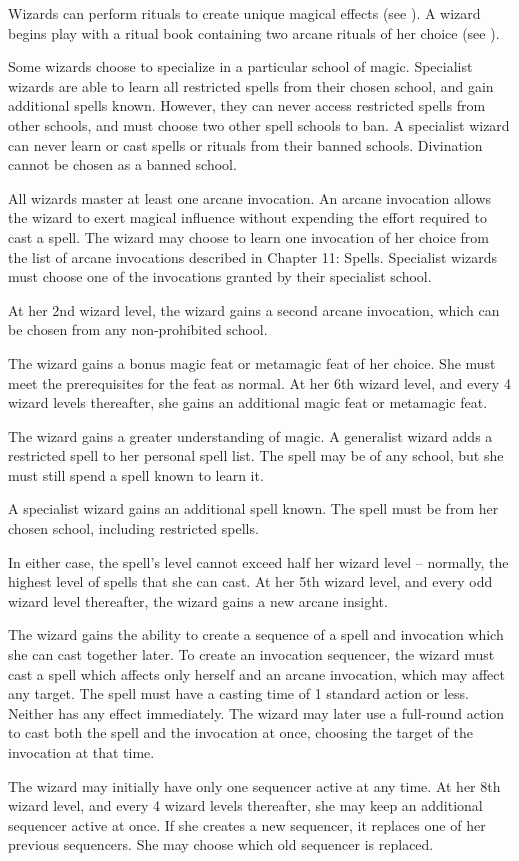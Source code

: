 Wizards can perform rituals to create unique magical effects (see ).
A wizard begins play with a ritual book containing two arcane rituals of her choice (see ).

Some wizards choose to specialize in a particular school of magic.
Specialist wizards are able to learn all restricted spells from their chosen school, and gain additional spells known.
However, they can never access restricted spells from other schools, and must choose two other spell schools to ban.
A specialist wizard can never learn or cast spells or rituals from their banned schools.
Divination cannot be chosen as a banned school.

All wizards master at least one arcane invocation.
An arcane invocation allows the wizard to exert magical influence without expending the effort required to cast a spell.
The wizard may choose to learn one invocation of her choice from the list of arcane invocations described in Chapter 11: Spells.
Specialist wizards must choose one of the invocations granted by their specialist school.

At her 2nd wizard level, the wizard gains a second arcane invocation, which can be chosen from any non-prohibited school.

The wizard gains a bonus magic feat or metamagic feat of her choice.
She must meet the prerequisites for the feat as normal.
At her 6th wizard level, and every 4 wizard levels thereafter, she gains an additional magic feat or metamagic feat.

The wizard gains a greater understanding of magic.
A generalist wizard adds a restricted spell to her personal spell list.
The spell may be of any school, but she must still spend a spell known to learn it.

A specialist wizard gains an additional spell known.
The spell must be from her chosen school, including restricted spells.

In either case, the spell's level cannot exceed half her wizard level -- normally, the highest level of spells that she can cast.
At her 5th wizard level, and every odd wizard level thereafter, the wizard gains a new arcane insight.

The wizard gains the ability to create a sequence of a spell and invocation which she can cast together later.
To create an invocation sequencer, the wizard must cast a spell which affects only herself and an arcane invocation, which may affect any target.
The spell must have a casting time of 1 standard action or less.
Neither has any effect immediately.
The wizard may later use a full-round action to cast both the spell and the invocation at once, choosing the target of the invocation at that time.
\par The wizard may initially have only one sequencer active at any time.
At her 8th wizard level, and every 4 wizard levels thereafter, she may keep an additional sequencer active at once.
If she creates a new sequencer, it replaces one of her previous sequencers.
She may choose which old sequencer is replaced.

